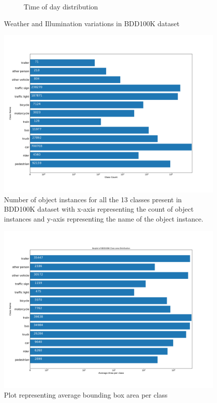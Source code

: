 \begin{figure}[H]
\begin{subfigure}[b]{0.495\textwidth}
             \caption[Time of Day samples count in \acrshort{bnn} dataset]{Time of day distribution }
             \label{fig:TOD-EDA}
         \end{subfigure}
            \caption{Weather and Illumination variations in BDD100K dataset}
    \end{figure}
    
    \begin{figure}[ht]
        \centering
        \includegraphics[scale=0.35]{images/EDA/BDD100K_objectcount_EDA.pdf}
        \caption[Object instances count in \acrshort{bdd} dataset]{Number of object instances for all the 13 classes present in BDD100K dataset with x-axis representing the count of object instances and y-axis representing the name of the object instance.}
        \label{fig:OC_EDA}
    \end{figure}
    
    \begin{figure}[ht]
        \centering
        \includegraphics[scale=0.35]{images/EDA/BDD100K_Average_Area_EDA.pdf}
        \caption[Average bounding box area vs Class name]{Plot representing average bounding box area per class}
        \label{fig:OA_EDA}
    \end{figure}
    
